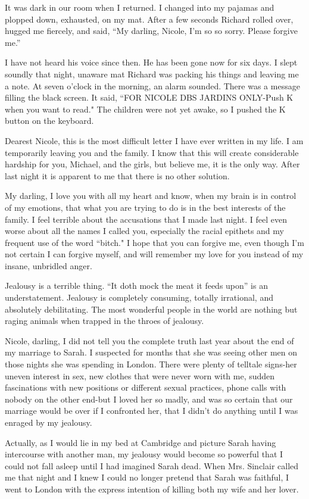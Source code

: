 \documentclass[]{article}
\begin{document}
It was dark in our room when I returned.  I changed into my pajamas and plopped down, exhausted, on my mat.  After a few seconds Richard rolled over, hugged me fiercely, and said, “My darling, Nicole, I’m so so sorry.  Please forgive me.”

I have not heard his voice since then.  He has been gone now for six days.  I slept soundly that night, unaware mat Richard was packing his things and leaving me a note.  At seven o’clock in the morning, an alarm sounded.  There was a message filling the black screen.  It said, “FOR NICOLE DBS JARDINS ONLY-Push K when you want to read."  The children were not yet awake, so I pushed the K button on the keyboard.

Dearest Nicole, this is the most difficult letter I have ever written in my life.  I am temporarily leaving you and the family.  I know that this will create considerable hardship for you, Michael, and the girls, but believe me, it is the only way.  After last night it is apparent to me that there is no other solution.

My darling, I love you with all my heart and know, when my brain is in control of my emotions, that what you are trying to do is in the best interests of the family.  I feel terrible about the accusations that I made last night.  I feel even worse about all the names I called you, especially the racial epithets and my frequent use of the word “bitch."  I hope that you can forgive me, even though I’m not certain I can forgive myself, and will remember my love for you instead of my insane, unbridled anger.

Jealousy is a terrible thing.  “It doth mock the meat it feeds upon” is an understatement.  Jealousy is completely consuming, totally irrational, and absolutely debilitating.  The most wonderful people in the world are nothing but raging animals when trapped in the throes of jealousy.

Nicole, darling, I did not tell you the complete truth last year about the end of my marriage to Sarah.  I suspected for months that she was seeing other men on those nights she was spending in London.  There were plenty of telltale signs-her uneven interest in sex, new clothes that were never worn with me, sudden fascinations with new positions or different sexual practices, phone calls with nobody on the other end-but I loved her so madly, and was so certain that our marriage would be over if I confronted her, that I didn’t do anything until I was enraged by my jealousy.

Actually, as I would lie in my bed at Cambridge and picture Sarah having intercourse with another man, my jealousy would become so powerful that I could not fall asleep until I had imagined Sarah dead.  When Mrs.  Sinclair called me that night and I knew I could no longer pretend that Sarah was faithful, I went to London with the express intention of killing both my wife and her lover.
\end{document}
